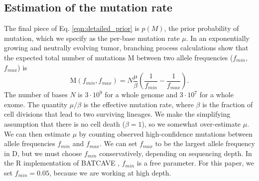 \documentclass[a4,center,fleqn]{NAR}
\newcommand{\batcave}{BATCAVE }
\begin{document}
\subsection{Estimation of the mutation rate}
The final piece of Eq. \ref{eqn:detailed_prior} is $p(M)$, the prior probability of mutation, which we specify as the per-base mutation rate $\mu$.
In an exponentially growing and neutrally evolving tumor, branching process calculations \cite{Williams2018} show that the expected total number of mutations $\mathrm{M}$ between two allele frequencies ($f_{min}$,$f_{max}$) is
\begin{equation}
  \label{eqn:mut_rate}
  \mathrm{M}(f_{min},f_{max}) = N\frac{\mu}{\beta}\left(\frac{1}{f_{min}} - \frac{1}{f_{max}}\right).
\end{equation}
The number of bases $N$ is $3\cdot10^9$ for a whole genome and $3\cdot10^7$ for a whole exome.
The quantity $\mu/\beta$ is the effective mutation rate, where $\beta$ is the fraction of cell divisions that lead to two surviving lineages.
We make the simplifying assumption that there is no cell death ($\beta = 1$), so we somewhat over-estimate $\mu$.
We can then estimate $\mu$ by counting observed high-confidence mutations between allele frequencies $f_{min}$ and $f_{max}$.
We can set $f_{max}$ to be the largest allele frequency in $\mathrm{D}$, but we must choose $f_{min}$ conservatively, depending on sequencing depth.
In the R implementation of \batcave, $f_{min}$ is a free parameter.
For this paper, we set $f_{min} = 0.05$, because we are working at high depth.
\end{document}
